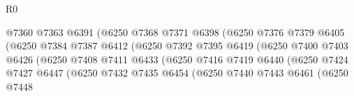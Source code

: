 \begin{lexlean}{R0}
\begin{coremodule}
                                          @7360
                                          @7363
                                          @6391
                                          (@6250
                                            @7368
                                            @7371
                                            @6398
                                            (@6250
                                              @7376
                                              @7379
                                              @6405
                                              (@6250
                                                @7384
                                                @7387
                                                @6412
                                                (@6250
                                                  @7392
                                                  @7395
                                                  @6419
                                                  (@6250
                                                    @7400
                                                    @7403
                                                    @6426
                                                    (@6250
                                                      @7408
                                                      @7411
                                                      @6433
                                                      (@6250
                                                        @7416
                                                        @7419
                                                        @6440
                                                        (@6250
                                                          @7424
                                                          @7427
                                                          @6447
                                                          (@6250
                                                            @7432
                                                            @7435
                                                            @6454
                                                            (@6250
                                                              @7440
                                                              @7443
                                                              @6461
                                                              (@6250
                                                                @7448

\end{coremodule}
\end{lexlean}
